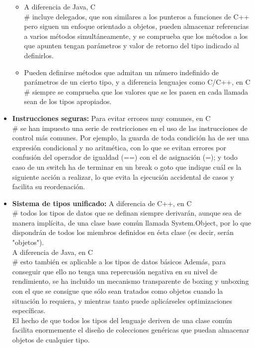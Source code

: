 \begin{itemize}
\begin{itemize}
			\item A diferencia de Java, C\\# incluye delegados, que son similares a los punteros a funciones de C++ pero siguen un enfoque orientado a objetos, pueden almacenar referencias a varios m\'etodos simult\'aneamente, y se comprueba que los m\'etodos a los que apunten tengan par\'ametros y valor de retorno del tipo indicado al definirlos. 
			\item Pueden definirse m\'etodos que admitan un n\'umero indefinido de par\'ametros de un cierto tipo, y a diferencia lenguajes como C/C++, en C\\# siempre se comprueba que los valores que se les pasen en cada llamada sean de los tipos apropiados. 
		\end{itemize}
	\item \textbf{Instrucciones seguras: } Para evitar errores muy comunes, en C\\# se han impuesto una serie de restricciones en el uso de las instrucciones de control m\'as comunes. Por ejemplo, la guarda de toda condici\'on ha de ser una expresi\'on condicional y no aritm\'etica, con lo que se evitan errores por confusi\'on del operador de igualdad (==) con el de asignaci\'on (=); y todo caso de un switch ha de terminar en un break o goto que indique cu\'al es la siguiente acci\'on a realizar, lo que evita la ejecuci\'on accidental de casos y facilita su reordenaci\'on.

	\item \textbf{Sistema de tipos unificado: } A diferencia de C++, en C\\# todos los tipos de datos que se definan siempre derivar\'an, aunque sea de manera impl\'icita, de una clase base com\'un llamada System.Object, por lo que dispondr\'an de todos los miembros definidos en \'esta clase (es decir, ser\'an "objetos").\\

	A diferencia de Java, en C\\# esto tambi\'en es aplicable a los tipos de datos b\'asicos Adem\'as, para conseguir que ello no tenga una repercusi\'on negativa en su nivel de rendimiento, se ha incluido un mecanismo transparente de boxing y unboxing con el que se consigue que s\'olo sean tratados como objetos cuando la situaci\'on lo requiera, y mientras tanto puede aplic\'arseles optimizaciones espec\'ificas.\\

	El hecho de que todos los tipos del lenguaje deriven de una clase com\'un facilita enormemente el dise\~no de colecciones gen\'ericas que puedan almacenar objetos de cualquier tipo. 


\end{itemize}
